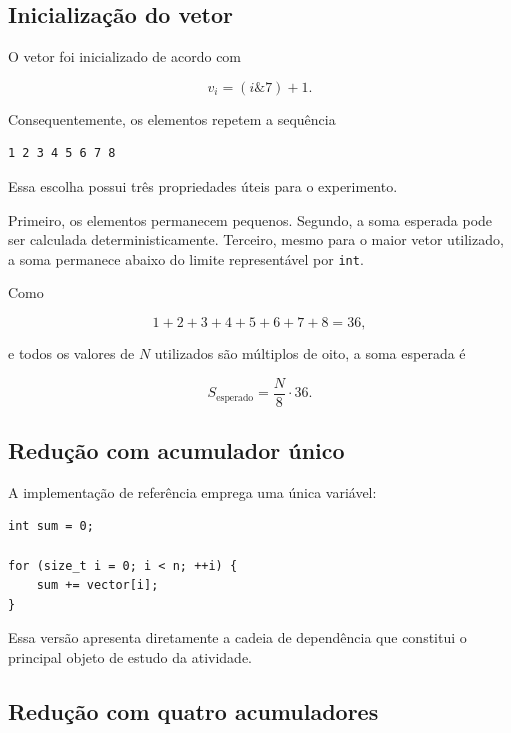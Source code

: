 \subsection{Inicialização do vetor}

O vetor foi inicializado de acordo com

\begin{equation}
v_i = (i \mathbin{\&} 7) + 1.
\end{equation}

Consequentemente, os elementos repetem a sequência

\begin{verbatim}
1 2 3 4 5 6 7 8
\end{verbatim}

Essa escolha possui três propriedades úteis para o experimento.

Primeiro, os elementos permanecem pequenos. Segundo, a soma esperada pode ser calculada
deterministicamente. Terceiro, mesmo para o maior vetor utilizado, a soma permanece abaixo do
limite representável por \texttt{int}.

Como

\begin{equation}
1+2+3+4+5+6+7+8=36,
\end{equation}

e todos os valores de \(N\) utilizados são múltiplos de oito, a soma esperada é

\begin{equation}
S_{\text{esperado}}=\frac{N}{8}\cdot 36.
\end{equation}


\subsection{Redução com acumulador único}

A implementação de referência emprega uma única variável:

\begin{verbatim}
int sum = 0;

for (size_t i = 0; i < n; ++i) {
    sum += vector[i];
}
\end{verbatim}

Essa versão apresenta diretamente a cadeia de dependência que constitui o principal objeto
de estudo da atividade.


\subsection{Redução com quatro acumuladores}


